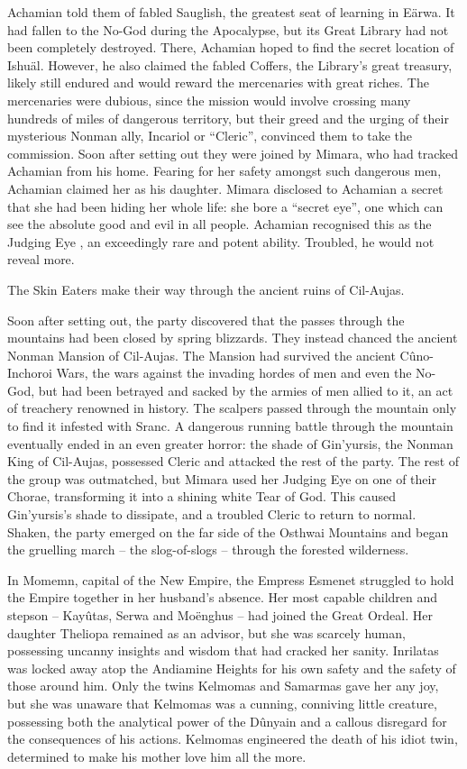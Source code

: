 \documentclass[]{book}
\begin{document}
Achamian told them of fabled Sauglish, the greatest seat of learning in Eärwa. It had
fallen to the No-God during the Apocalypse, but its Great Library had not been
completely destroyed. There, Achamian hoped to find the secret location of Ishuäl.
However, he also claimed the fabled Coffers, the Library's great treasury, likely still
endured and would reward the mercenaries with great riches. The mercenaries were
dubious, since the mission would involve crossing many hundreds of miles of
dangerous territory, but their greed and the urging of their mysterious Nonman ally,
Incariol or ``Cleric'', convinced them to take the commission. Soon after setting out
they were joined by Mimara, who had tracked Achamian from his home. Fearing for
her safety amongst such dangerous men, Achamian claimed her as his daughter.
Mimara disclosed to Achamian a secret that she had been hiding her whole life: she
bore a ``secret eye'', one which can see the absolute good and evil in all people.
Achamian recognised this as the Judging Eye , an exceedingly rare and potent ability.
Troubled, he would not reveal more.

The Skin Eaters make their way through the ancient ruins of Cil-Aujas.

Soon after setting out, the party discovered that the passes through the mountains had
been closed by spring blizzards. They instead chanced the ancient Nonman Mansion of
Cil-Aujas. The Mansion had survived the ancient Cûno-Inchoroi Wars, the wars against
the invading hordes of men and even the No-God, but had been betrayed and sacked
by the armies of men allied to it, an act of treachery renowned in history. The scalpers
passed through the mountain only to find it infested with Sranc. A dangerous running
battle through the mountain eventually ended in an even greater horror: the shade of
Gin'yursis, the Nonman King of Cil-Aujas, possessed Cleric and attacked the rest of the
party. The rest of the group was outmatched, but Mimara used her Judging Eye on one
of their Chorae, transforming it into a shining white Tear of God. This caused
Gin'yursis's shade to dissipate, and a troubled Cleric to return to normal. Shaken, the
party emerged on the far side of the Osthwai Mountains and began the gruelling march
-- the slog-of-slogs -- through the forested wilderness.

In Momemn, capital of the New Empire, the Empress Esmenet struggled to hold the
Empire together in her husband's absence. Her most capable children and stepson --
Kayûtas, Serwa and Moënghus -- had joined the Great Ordeal. Her daughter Theliopa
remained as an advisor, but she was scarcely human, possessing uncanny insights and
wisdom that had cracked her sanity. Inrilatas was locked away atop the Andiamine
Heights for his own safety and the safety of those around him. Only the twins
Kelmomas and Samarmas gave her any joy, but she was unaware that Kelmomas was a
cunning, conniving little creature, possessing both the analytical power of the Dûnyain
and a callous disregard for the consequences of his actions. Kelmomas engineered the
death of his idiot twin, determined to make his mother love him all the more.
\end{document}
